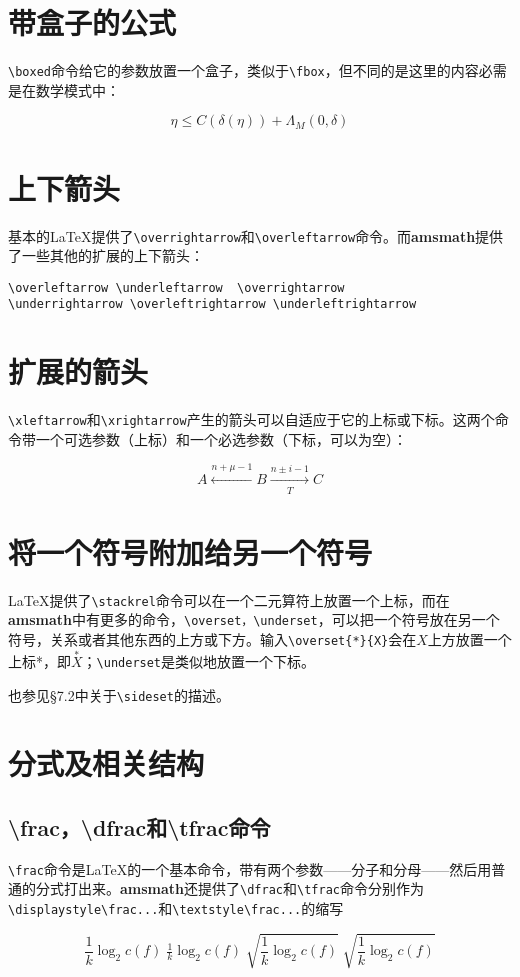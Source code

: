 \documentclass[openany]{ctexbook}
\begin{document}
\section{带盒子的公式}
\verb|\boxed|命令给它的参数放置一个盒子，类似于\verb|\fbox|，但不同的是这里的内容必需是在数学模式中：
\begin{tcblisting}{}
\begin{equation}
\boxed{\eta\le C(\delta(\eta))+\Lambda_M(0,\delta)}
\end{equation}
\end{tcblisting}

\section{上下箭头}
基本的\LaTeX 提供了\verb|\overrightarrow|和\verb|\overleftarrow|命令。而{\bfseries amsmath}提供了一些其他的扩展的上下箭头：
\begin{verbatim}
\overleftarrow \underleftarrow  \overrightarrow
\underrightarrow \overleftrightarrow \underleftrightarrow
\end{verbatim}
\section{扩展的箭头}
\verb|\xleftarrow|和\verb|\xrightarrow|产生的箭头可以自适应于它的上标或下标。这两个命令带一个可选参数（上标）和一个必选参数（下标，可以为空）：
\begin{tcblisting}{}
\begin{equation}
A\xleftarrow{n+\mu-1}B\xrightarrow[T]{n\pm i-1}C
\end{equation}
\end{tcblisting}

\section{将一个符号附加给另一个符号}
\LaTeX 提供了\verb|\stackrel|命令可以在一个二元算符上放置一个上标，而在{\bfseries amsmath}中有更多的命令，\verb|\overset，\underset|，可以把一个符号放在另一个符号，关系或者其他东西的上方或下方。输入\verb|\overset{*}{X}|会在$X$上方放置一个上标*，即$\overset{*}{X}$；\verb|\underset|是类似地放置一个下标。

也参见\S7.2中关于\verb|\sideset|的描述。
\section{分式及相关结构}
\subsection{\textbackslash frac，\textbackslash dfrac和\textbackslash tfrac命令}
\verb|\frac|命令是\LaTeX 的一个基本命令，带有两个参数——分子和分母——然后用普通的分式打出来。{\bfseries amsmath}还提供了\verb|\dfrac|和\verb|\tfrac|命令分别作为\verb|\displaystyle\frac...|和\verb|\textstyle\frac...|的缩写
\begin{tcblisting}{}
\begin{equation}
\frac{1}{k}\log_2 c(f)\;\tfrac{1}{k}\log_2 c(f)\;
\sqrt{\frac{1}{k}\log_2 c(f)}\;\sqrt{\dfrac{1}{k}\log_2 c(f)}
\end{equation}
\end{tcblisting}
\end{document}
